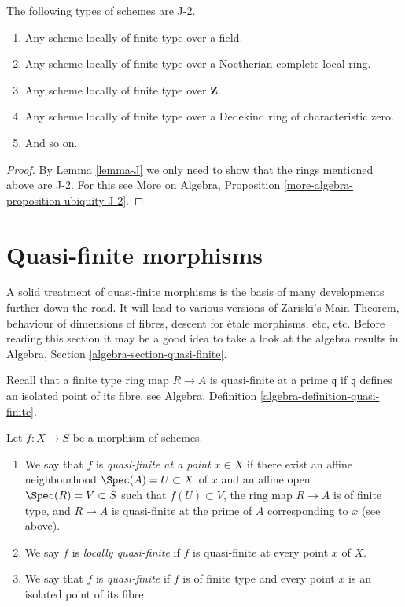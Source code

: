 \begin{lemma}
\label{lemma-ubiquity-J-2}
The following types of schemes are J-2.
\begin{enumerate}
\item Any scheme locally of finite type over a field.
\item Any scheme locally of finite type over a Noetherian complete local ring.
\item Any scheme locally of finite type over $\mathbf{Z}$.
\item Any scheme locally of finite type over a Dedekind ring of
characteristic zero.
\item And so on.
\end{enumerate}
\end{lemma}

\begin{proof}
By Lemma \ref{lemma-J} we only need to show that
the rings mentioned above are J-2. For this see
More on Algebra, Proposition \ref{more-algebra-proposition-ubiquity-J-2}.
\end{proof}



\section{Quasi-finite morphisms}
\label{section-quasi-finite}

\noindent
A solid treatment of quasi-finite morphisms is the basis of many developments
further down the road. It will lead to various versions of Zariski's Main
Theorem, behaviour of dimensions of fibres, descent for \'etale morphisms, etc,
etc. Before reading this section it may be a good idea to take a look at
the algebra results in Algebra, Section \ref{algebra-section-quasi-finite}.

\medskip\noindent
Recall that a finite type ring map $R \to A$ is quasi-finite at
a prime $\mathfrak q$ if $\mathfrak q$ defines an isolated point
of its fibre, see Algebra, Definition \ref{algebra-definition-quasi-finite}.

\begin{definition}
\label{definition-quasi-finite}
Let $f : X \to S$ be a morphism of schemes.
\begin{enumerate}
\item We say that $f$ is {\it quasi-finite at a point $x \in X$}
if there exist an affine neighbourhood $\Spec(A) = U \subset X$
of $x$ and an affine open $\Spec(R) = V \subset S$ such that
$f(U) \subset V$, the ring map $R \to A$ is of finite type,
and $R \to A$ is quasi-finite at the prime of $A$ corresponding to $x$
(see above).
\item We say $f$ is {\it locally quasi-finite} if $f$ is
quasi-finite at every point $x$ of $X$.
\item We say that $f$ is {\it quasi-finite} if $f$ is of finite type
and every point $x$ is an isolated point of its fibre.
\end{enumerate}
\end{definition}

